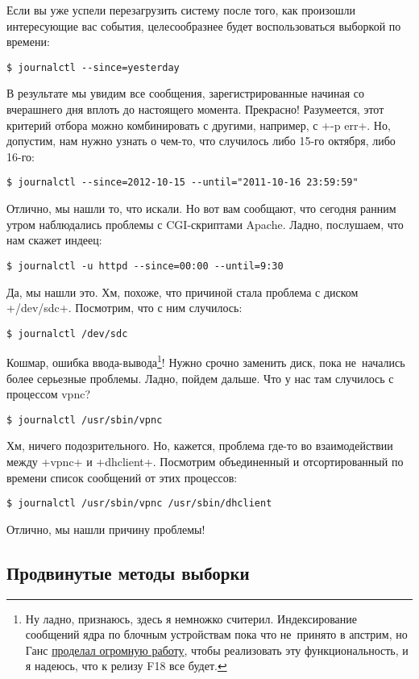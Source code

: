 \documentclass[10pt,oneside,a4paper]{article}
\begin{document}
Если вы уже успели перезагрузить систему после того, как произошли интересующие
вас события, целесообразнее будет воспользоваться выборкой по времени:
\begin{Verbatim}
$ journalctl --since=yesterday
\end{Verbatim}
В результате мы увидим все сообщения, зарегистрированные начиная со вчерашнего
дня вплоть до настоящего момента. Прекрасно! Разумеется, этот критерий отбора можно
комбинировать с другими, например, с +-p err+. Но, допустим, нам нужно узнать о
чем-то, что случилось либо 15-го октября, либо 16-го:
\begin{Verbatim}
$ journalctl --since=2012-10-15 --until="2011-10-16 23:59:59"
\end{Verbatim}
Отлично, мы нашли то, что искали. Но вот вам сообщают, что сегодня ранним утром
наблюдались проблемы с CGI-скриптами Apache. Ладно, послушаем, что нам скажет
индеец:
\begin{Verbatim}
$ journalctl -u httpd --since=00:00 --until=9:30
\end{Verbatim}
Да, мы нашли это. Хм, похоже, что причиной стала проблема с диском +/dev/sdc+.
Посмотрим, что с ним случилось:
\begin{Verbatim}
$ journalctl /dev/sdc
\end{Verbatim}
Кошмар, ошибка ввода-вывода\footnote{Ну ладно, признаюсь, здесь я немножко
считерил. Индексирование сообщений ядра по блочным устройствам пока что
не~принято в апстрим, но Ганс
\href{http://www.spinics.net/lists/linux-scsi/msg62499.html}{проделал огромную
работу}, чтобы реализовать эту функциональность, и я надеюсь, что к релизу F18
все будет.}! Нужно срочно заменить диск, пока не~начались более серьезные
проблемы. Ладно, пойдем дальше. Что у нас там случилось с процессом vpnc?
\begin{Verbatim}
$ journalctl /usr/sbin/vpnc
\end{Verbatim}
Хм, ничего подозрительного. Но, кажется, проблема где-то во взаимодействии между
+vpnc+ и +dhclient+. Посмотрим объединенный и отсортированный по времени список
сообщений от этих процессов:
\begin{Verbatim}
$ journalctl /usr/sbin/vpnc /usr/sbin/dhclient
\end{Verbatim}
Отлично, мы нашли причину проблемы!

\subsection{Продвинутые методы выборки}
\end{document}

